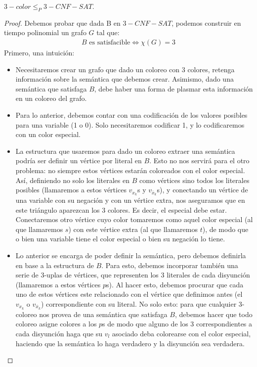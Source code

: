 \begin{proposition}
$3-color \le_P 3-CNF-SAT$.
\end{proposition}
\begin{proof}
Debemos probar que dada B en $3-CNF-SAT$, podemos construir en tiempo polinomial un grafo $G$ tal que:
\begin{align}
    B \text{ es satisfacible} \iff \chi(G) = 3
\end{align}
Primero, una intuición:
\begin{itemize}
    \item Necesitaremos crear un grafo que dado un coloreo con 3 colores, retenga información sobre la semántica que debemos crear. Asimismo, dado una semántica que satisfaga $B$, debe haber una forma de plasmar esta información en un coloreo del grafo.
    \item Para lo anterior, debemos contar con una codificación de los valores posibles para una variable (1 o 0). Solo necesitaremos codificar 1, y lo codificaremos con un color especial.
    \item La estructura que usaremos para dado un coloreo extraer una semántica podría ser definir un vértice por literal en $B$. Esto no nos servirá para el otro problema: no siempre estos vértices estarán coloreados con el color especial. Así, definiendo no solo los literales en $B$ como vértices sino todos los literales posibles (llamaremos a estos vértices $v_{x_k}$s y $v_{\overline{x}_k}$s), y conectando un vértice de una variable con su negación y con un vértice extra, nos aseguramos que en este triángulo aparezcan los 3 colores. Es decir, el especial debe estar. Conectaremos otro vértice cuyo color tomaremos como aquel color especial (al que llamaremos $s$) con este vértice extra (al que llamaremos $t$), de modo que o bien una variable tiene el color especial o bien su negación lo tiene.
    \item Lo anterior se encarga de poder definir la semántica, pero debemos definirla en base a la estructura de $B$. Para esto, debemos incorporar también una serie de 3-uplas de vértices, que representen los 3 literales de cada disyunción (llamaremos a estos vértices $p$s). Al hacer esto, debemos procurar que cada uno de estos vértices este relacionado con el vértice que definimos antes (el $v_{x_k}$ o $v_{\overline{x}_k}$) correspondiente con su literal. No solo esto: para que cualquier 3-coloreo nos provea de una semántica que satisfaga $B$, debemos hacer que todo coloreo asigne colores a los $p$s de modo que alguno de los 3 correspondientes a cada disyunción haga que su $v_l$ asociado deba colorearse con el color especial, haciendo que la semántica lo haga verdadero y la disyunción sea verdadera.

\end{itemize}
\end{proof}
